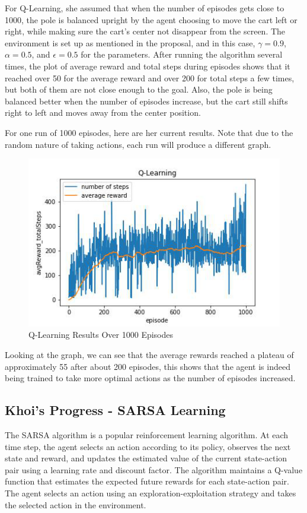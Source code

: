 \documentclass[nohyperref]{article}
\theoremstyle{plain}
\theoremstyle{definition}
\theoremstyle{remark}
\begin{document}
For Q-Learning, she assumed that when the number of episodes gets close to 1000, the pole is balanced upright by the agent choosing to move the cart left or right, while making sure the cart's center not disappear from the screen. 
The environment is set up as mentioned in the proposal, and in this case, $\gamma = 0.9$, $\alpha = 0.5$, and $\epsilon = 0.5$ for the parameters.  
After running the algorithm several times, the plot of average reward and total steps during episodes shows that it reached over 50 for the average reward and over 200 for total steps a few times, but both of them are not close enough to the goal.
Also, the pole is being balanced better when the number of episodes increase, but the cart still shifts right to left and moves away from the center position.

For one run of 1000 episodes, here are her current results. Note that due to the random nature of taking actions, each run will produce a different graph.

\begin{figure}[H] %
    \centering
    \includegraphics[width=1\linewidth]{q-learning-average-1k.png}
    \caption{Q-Learning Results Over 1000 Episodes}
\end{figure}

Looking at the graph, we can see that the average rewards reached a plateau of approximately 55 after about 200 episodes, this shows that the agent is indeed being trained to
take more optimal actions as the number of episodes increased.

\subsection{Khoi's Progress - SARSA Learning}
The SARSA algorithm is a popular reinforcement learning algorithm. At each time step, the agent selects an action according to its policy, observes the next state and reward, and updates the estimated value of the current state-action pair using a learning rate and discount factor. 
The algorithm maintains a Q-value function that estimates the expected future rewards for each state-action pair. The agent selects an action using an exploration-exploitation strategy and takes the selected action in the environment.
\end{document}
